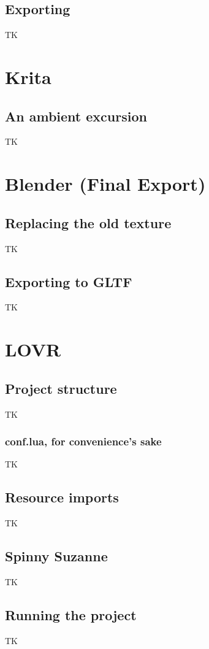 \documentclass[12pt, letterpaper]{article}
\begin{document}
\subsection{Exporting}
TK

\section{Krita}

\subsection{An ambient excursion}
TK

\section{Blender (Final Export)}

\subsection{Replacing the old texture}
TK

\subsection{Exporting to GLTF}
TK

\section{LOVR}

\subsection{Project structure}
TK

\subsubsection{conf.lua, for convenience's sake}
TK

\subsection{Resource imports}
TK

\subsection{Spinny Suzanne}
TK

\subsection{Running the project}
TK
\end{document}
